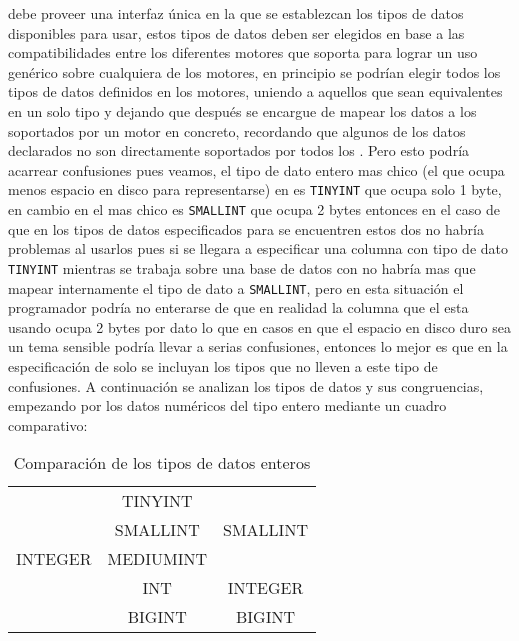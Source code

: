 \cc debe proveer una interfaz única en la que se establezcan los tipos de datos disponibles para usar, estos tipos de datos deben ser elegidos en base a las compatibilidades entre los diferentes motores que soporta para lograr un uso genérico sobre cualquiera de los motores, en principio se podrían elegir todos los tipos de datos definidos en los motores, uniendo a aquellos que sean equivalentes en un solo tipo y dejando que después \cc se encargue de mapear los datos a los soportados por un motor en concreto, recordando que algunos de los datos declarados no son directamente soportados por todos los \dd. Pero esto podría acarrear confusiones pues veamos, el tipo de dato entero mas chico (el que ocupa menos espacio en disco para representarse) en \m es \verb=TINYINT= que ocupa solo 1 byte, en cambio en \p el mas chico es \verb=SMALLINT= que ocupa 2 bytes entonces en el caso de que en los tipos de datos especificados para \cc se encuentren estos dos no habría problemas al usarlos pues si se llegara a especificar una columna con tipo de dato \verb=TINYINT= mientras se trabaja sobre una base de datos con \p no habría mas que mapear internamente el tipo de dato a \verb=SMALLINT=, pero en esta situación el programador podría no enterarse de que en realidad la columna que el esta usando ocupa 2 bytes por dato lo que en casos en que el espacio en disco duro sea un tema sensible podría llevar a serias confusiones, entonces lo mejor es que en la especificación de \cc solo se incluyan los tipos que no lleven a este tipo de confusiones. A continuación se analizan los tipos de datos y sus congruencias, empezando por los datos numéricos del tipo entero mediante un cuadro comparativo:
        
\begin{table}[h]
\begin{center}
\begin{tabular}{|c|c|c|}
\hline \s      & \m        & \p \\ 
\hline         & TINYINT   &  \\ 
               & SMALLINT  & SMALLINT \\ 
       INTEGER & MEDIUMINT &  \\
               & INT       & INTEGER \\
               & BIGINT    & BIGINT \\  
\hline 
\end{tabular} 
\end{center}
\caption{Comparación de los tipos de datos enteros}
\end{table}

